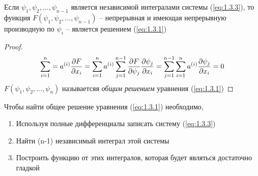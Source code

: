 \documentclass[../main.tex]{subfiles}
\begin{document}
\begin{theorem}
	Если $\psi_1, \psi_2, \dots, \psi_{n-1}$ является независимой интегралами системы (\ref*{eq:1.3.3}),
	то функция $F(\psi_1, \psi_2, \dots, \psi_{n-1})$ -- непрерывная и имеющая непрерывную
	производную по $\psi_i$ -- является решением (\ref*{eq:1.3.1})
\end{theorem}
\begin{proof}
	\begin{gather*}
		\sum_{i=1}^n = a^{(i)}\frac{\partial F}{\partial x_i} =
		\sum_{i=1}^n a^{(i)} \sum_{j=1}^{n-1}\frac{\partial F}{\partial \psi_j}\frac{\partial \psi_j}{\partial x_i} =
		\sum_{j=1}^{n-1} \sum_{i=1}^n a^{(i)} \frac{\partial \psi_j}{\partial x_i} = 0
	\end{gather*}
	$F(\psi_1, \psi_2,\dots,\psi_n)$ называетсяя \textit{общим решением} уравнения (\ref*{eq:1.3.1})
\end{proof}
Чтобы найти общее решение уравнения (\ref*{eq:1.3.1}) необходимо,
\begin{enumerate}
	\item Используя полные дифференциалы записать систему (\ref*{eq:1.3.3})
	\item Найти (n-1) независимый интеграл этой системы
	\item Построить функцию от этих интегралов, которая будет являться достаточно гладкой
\end{enumerate}
\end{document}
